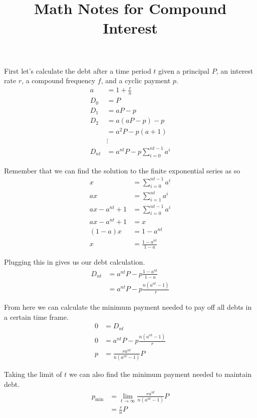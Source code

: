 \documentclass[12pt]{article}
\title{Math Notes for Compound Interest}
\author{}
\date{}
\begin{document}
\maketitle

First let's calculate the debt after a time period $t$ given a principal $P$, an
interest rate $r$, a compound frequency $f$, and a cyclic payment $p$.
\begin{align*}
    a &= 1 + \frac{r}{n}\\
    D_0 &= P\\
    D_1 &= aP - p\\
    D_2 &= a(aP - p) - p\\
        &= a^2 P - p (a + 1)\\
        &\vdots\\
    D_{nt} &= a^{nt} P - p \sum_{i = 0}^{nt - 1} a^i
\end{align*}

Remember that we can find the solution to the finite exponential series as so
\begin{align*}
    x &= \sum_{i = 0}^{nt - 1} a^i\\
    ax &= \sum_{i = 1}^{nt} a^i\\
    ax - a^{nt} + 1 &= \sum_{i = 0}^{nt - 1} a^i\\
    ax - a^{nt} + 1 &= x\\
    (1 - a) x &= 1 - a^{nt}\\
    x &= \frac{1 - a^{nt}}{1 - a}
\end{align*}

Plugging this in gives us our debt calculation.
\begin{align*}
    D_{nt} &= a^{nt} P - p \frac{1 - a^{nt}}{1 - a}\\
           &= a^{nt} P - p \frac{n (a^{nt} - 1)}{r}
\end{align*}

From here we can calculate the minimum payment needed to pay off all debts in
a certain time frame.
\begin{align*}
    0 &= D_{nt}\\
    0 &= a^{nt} P - p \frac{n (a^{nt} - 1)}{r}\\
    p &= \frac{r a^{nt}}{n (a^{nt} - 1)} P
\end{align*}

Taking the limit of $t$ we can also find the minimum payment needed to maintain
debt.
\begin{align*}
    p_\text{min} &= \lim_{t \to \infty} \frac{r a^{nt}}{n (a^{nt} - 1)} P\\
                 &= \frac{r}{n} P
\end{align*}
\end{document}
